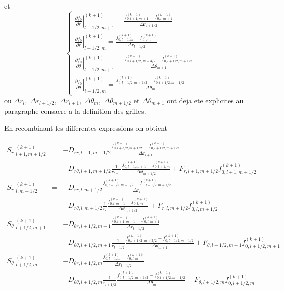  et \[
\left\{ \begin{array}{l}
\left.\frac{\partial f_{0}}{\partial r}\right|_{l+1/2,m+1}^{(k+1)}=\frac{f_{0,l+1,m+1}^{(k+1)}-f_{0,l,m+1}^{(k+1)}}{\Delta r_{l+1/2}}\\
\left.\frac{\partial f_{0}}{\partial r}\right|_{l+1/2,m}^{(k+1)}=\frac{f_{0,l+1,m}^{(k+1)}-f_{0,,m}^{(k+1)}}{\Delta r_{l+1/2}}\\
\left.\frac{\partial f_{0}}{\partial\theta}\right|_{l+1/2,m+1}^{(k+1)}=\frac{f_{0,l+1/2,m+3/2}^{(k+1)}-f_{0,l+1/2,m+1/2}^{(k+1)}}{\Delta\theta_{m+1}}\\
\left.\frac{\partial f_{0}}{\partial\theta}\right|_{i+1/2,m}^{(k+1)}=\frac{f_{0,l+1/2,m+1/2}^{(k+1)}-f_{0,l+1/2,m-1/2}^{(k+1)}}{\Delta\theta_{m}}\end{array}\right.\]
 ou $\Delta r_{l},$ $\Delta r_{l+1/2},$ $\Delta r_{l+1},$ $\Delta\theta_{m},$
$\Delta\theta_{m+1/2}$ et $\Delta\theta_{m+1}$ ont deja ete explicites
au paragraphe consacre a la definition des grilles.

En recombinant les differentes expressions on obtient

\begin{eqnarray*}
\left.S_{r}\right|_{l+1,m+1/2}^{(k+1)} & = & -D_{rr,l+1,m+1/2}\frac{f_{0,l+3/2,m+1/2}^{(k+1)}-f_{0,l+1/2,m+1/2}^{(k+1)}}{\Delta r_{l+1}}\\
 &  & -D_{r\theta,l+1,m+1/2}\frac{1}{r_{l+1}}\frac{f_{0,l+1,m+1}^{(k+1)}-f_{0,l+1,m}^{(k+1)}}{\Delta\theta_{m+1/2}}+F_{r,l+1,m+1/2}f_{0,l+1,m+1/2}^{(k+1)}\\
\left.S_{r}\right|_{l,m+1/2}^{(k+1)} & = & -D_{rr,l,m+1/2}\frac{f_{0,l+1/2,m+1/2}^{(k+1)}-f_{0,l-1/2,m+1/2}^{(k+1)}}{\Delta r_{l}}\\
 &  & -D_{r\theta,l,m+1/2}\frac{1}{r_{l}}\frac{f_{0,l,m+1}^{(k+1)}-f_{0,l,m}^{(k+1)}}{\Delta\theta_{m+1/2}}+F_{r,l,m+1/2}f_{0,l,m+1/2}^{(k+1)}\\
\left.S_{\theta}\right|_{l+1/2,m+1}^{(k+1)} & = & -D_{\theta r,l+1/2,m+1}\frac{f_{0,l+1,m+1}^{(k+1)}-f_{0,l,m+1}^{(k+1)}}{\Delta r_{l+1/2}}\\
 &  & -D_{\theta\theta,l+1/2,m+1}\frac{1}{r_{l+1/2}}\frac{f_{0,l+1/2,m+3/2}^{(k+1)}-f_{0,l+1/2,m+1/2}^{(k+1)}}{\Delta\theta_{m+1}}+F_{\theta,l+1/2,m+1}f_{0,l+1/2,m+1}^{(k+1)}\\
\left.S_{\theta}\right|_{l+1/2,m}^{(k+1)} & = & -D_{\theta r,l+1/2,m}\frac{f_{0,l+1,m}^{(k+1)}-f_{0,l,m}^{(k+1)}}{\Delta r_{l+1/2}}\\
 &  & -D_{\theta\theta,l+1/2,m}\frac{1}{r_{l+1/2}}\frac{f_{0,l+1/2,m+1/2}^{(k+1)}-f_{0,l+1/2,m-1/2}^{(k+1)}}{\Delta\theta_{m}}+F_{\theta,l+1/2,m}f_{0,l+1/2,m}^{(k+1)}\end{eqnarray*}


